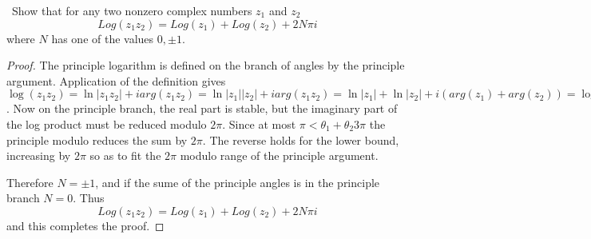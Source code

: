 \documentclass[11pt]{amsart}
\theoremstyle{definition}
\numberwithin{theorem}{section}
\numberwithin{definition}{section}
\numberwithin{equation}{section}
\begin{document}
\medskip {}\ Show that for any two nonzero complex numbers $z_1$ and $z_2$
\begin{equation*}
	Log(z_1z_2) = Log(z_1) + Log(z_2) + 2N\pi i
\end{equation*}
where $N$ has one of the values $0, \pm 1$.
\begin{proof}
	The principle logarithm is defined on the branch of angles by the principle argument. 
	Application of the definition gives
	$\log(z_1z_2) = \ln|z_1z_2| + i arg(z_1z_2) = 
	\ln|z_1||z_2| + iarg(z_1z_2) = \ln|z_1|+\ln|z_2| + i(arg(z_1) + arg(z_2)) = \log(z_1) + \log(z_2)$.
	Now on the principle branch, the real part is stable, but the imaginary part of the log product must be reduced modulo $2\pi.$ Since at most $\pi <\theta_1 + \theta_2 3\pi$ the principle modulo reduces the sum by $2\pi.$ The reverse holds for the lower bound, increasing by $2\pi$ so as to fit the $2\pi$ modulo range of the principle argument.

	Therefore $N = \pm 1$, and if the sume of the principle angles is in the principle branch $N=0$. Thus
	\begin{equation*}
		Log(z_1z_2) = Log(z_1) + Log(z_2) + 2N\pi i
	\end{equation*}
	and this completes the proof.
\end{proof}
\end{document}
